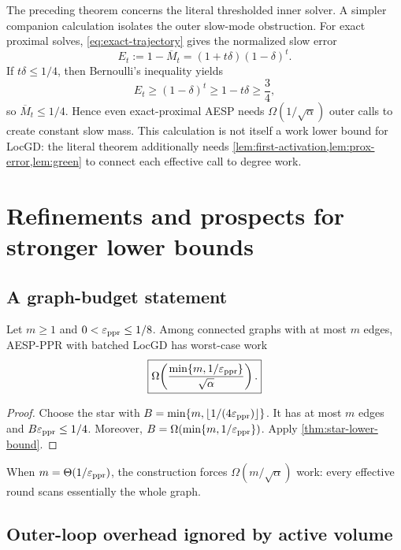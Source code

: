 \documentclass[11pt]{article}
\begin{document}
The preceding theorem concerns the literal thresholded inner solver.  A
simpler companion calculation isolates the outer slow-mode obstruction.  For
exact proximal solves, \cref{eq:exact-trajectory} gives the normalized slow
error
\begin{equation}
  E_t:=1-\overline M_t
  =(1+t\delta)(1-\delta)^t.
  \label{eq:exact-error}
\end{equation}
If $t\delta\leq1/4$, then Bernoulli's inequality yields
\[
  E_t\geq(1-\delta)^t\geq1-t\delta\geq\frac34,
\]
so $\overline M_t\leq1/4$.  Hence even exact-proximal AESP needs
$\Omega(1/\sqrt\alpha)$ outer calls to create constant slow mass.  This
calculation is not itself a work lower bound for LocGD: the literal theorem
additionally needs \cref{lem:first-activation,lem:prox-error,lem:green} to
connect each effective call to degree work.

\section{Refinements and prospects for stronger lower bounds}
\label{sec:refinements}

\subsection{A graph-budget statement}

\begin{corollary}
\label{cor:edge-budget}
Let $m\geq1$ and $0<\varepsilon_{\mathrm{ppr}}\leq1/8$.  Among connected graphs with at most
$m$ edges, AESP-PPR with batched LocGD has worst-case work
\begin{equation}
  \boxed{
  \Omega\!\left(
    \frac{\min\{m,1/\varepsilon_{\mathrm{ppr}}\}}{\sqrt\alpha}
  \right).}
  \label{eq:edge-budget}
\end{equation}
\end{corollary}

\begin{proof}
Choose the star with
$B=\min\{m,\lfloor1/(4\varepsilon_{\mathrm{ppr}})\rfloor\}$.  It has at most $m$ edges and
$B\varepsilon_{\mathrm{ppr}}\leq1/4$.  Moreover,
$B=\Omega(\min\{m,1/\varepsilon_{\mathrm{ppr}}\})$.  Apply
\cref{thm:star-lower-bound}.
\end{proof}

When $m=\Theta(1/\varepsilon_{\mathrm{ppr}})$, the construction forces
$\Omega(m/\sqrt\alpha)$ work: every effective round scans essentially the
whole graph.

\subsection{Outer-loop overhead ignored by active volume}
\end{document}
